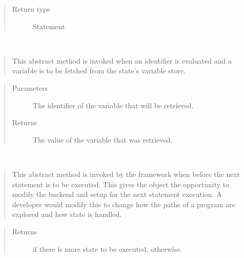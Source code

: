 \documentclass[letterpaper,10pt,english]{sphinxmanual}
\begin{document}
\begin{fulllineitems}
\begin{fulllineitems}
\begin{quote}
\begin{description}
\item[{Return type}] \leavevmode
\sphinxAtStartPar
Statement

\end{description}\end{quote}

\end{fulllineitems}


\begin{fulllineitems}
\label{\detokenize{index:State.State.get_variable}}~\begin{quote}

\sphinxAtStartPar
This abstract method is invoked when an identifier is evaluated and a variable is
to be fetched from the state’s variable store.
\end{quote}
\begin{quote}\begin{description}
\item[{Parameters}] \leavevmode
\sphinxAtStartPar
{} \textendash{} The identifier of the variable that will be retrieved.

\item[{Returns}] \leavevmode
\sphinxAtStartPar
The value of the variable that was retrieved.

\end{description}\end{quote}

\end{fulllineitems}


\begin{fulllineitems}
\label{\detokenize{index:State.State.next_state}}~\begin{quote}

\sphinxAtStartPar
This abstract method is invoked by the framework when before the next
statement is to be executed. This gives the  object the opportunity
to modify the backend and setup for the next
statement execution. A developer would modify this to change
how the paths of a program are explored and how state is handled.
\end{quote}
\begin{quote}\begin{description}
\item[{Returns}] \leavevmode
\sphinxAtStartPar
{} if there is more state to be executed,  otherwise.


\end{description}
\end{quote}
\end{fulllineitems}
\end{fulllineitems}
\end{document}
